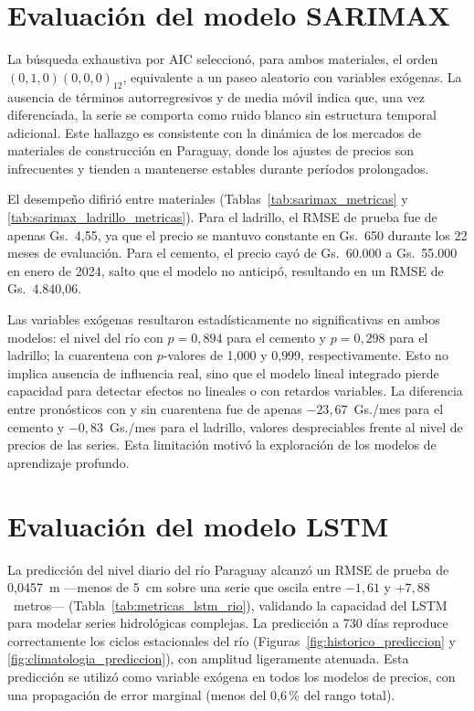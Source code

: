 
\section{Evaluación del modelo SARIMAX}

\justify
La búsqueda exhaustiva por AIC seleccionó, para ambos materiales, el orden $(0,1,0)(0,0,0)_{12}$, equivalente a un paseo aleatorio con variables exógenas. La ausencia de términos autorregresivos y de media móvil indica que, una vez diferenciada, la serie se comporta como ruido blanco sin estructura temporal adicional. Este hallazgo es consistente con la dinámica de los mercados de materiales de construcción en Paraguay, donde los ajustes de precios son infrecuentes y tienden a mantenerse estables durante períodos prolongados.

\justify
El desempeño difirió entre materiales (Tablas~\ref{tab:sarimax_metricas} y \ref{tab:sarimax_ladrillo_metricas}). Para el ladrillo, el RMSE de prueba fue de apenas Gs.~4,55, ya que el precio se mantuvo constante en Gs.~650 durante los 22 meses de evaluación. Para el cemento, el precio cayó de Gs.~60.000 a Gs.~55.000 en enero de 2024, salto que el modelo no anticipó, resultando en un RMSE de Gs.~4.840,06.

\justify
Las variables exógenas resultaron estadísticamente no significativas en ambos modelos: el nivel del río con $p=0{,}894$ para el cemento y $p=0{,}298$ para el ladrillo; la cuarentena con $p$-valores de 1{,}000 y 0{,}999, respectivamente. Esto no implica ausencia de influencia real, sino que el modelo lineal integrado pierde capacidad para detectar efectos no lineales o con retardos variables. La diferencia entre pronósticos con y sin cuarentena fue de apenas $-23{,}67$~Gs./mes para el cemento y $-0{,}83$~Gs./mes para el ladrillo, valores despreciables frente al nivel de precios de las series. Esta limitación motivó la exploración de los modelos de aprendizaje profundo.

\section{Evaluación del modelo LSTM}

\justify
La predicción del nivel diario del río Paraguay alcanzó un RMSE de prueba de 0{,}0457~m ---menos de 5~cm sobre una serie que oscila entre $-1{,}61$ y $+7{,}88$~metros--- (Tabla~\ref{tab:metricas_lstm_rio}), validando la capacidad del LSTM para modelar series hidrológicas complejas. La predicción a 730 días reproduce correctamente los ciclos estacionales del río (Figuras~\ref{fig:historico_prediccion} y \ref{fig:climatologia_prediccion}), con amplitud ligeramente atenuada. Esta predicción se utilizó como variable exógena en todos los modelos de precios, con una propagación de error marginal (menos del 0{,}6\,\% del rango total).

